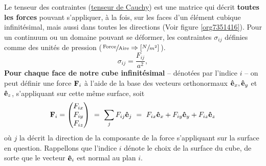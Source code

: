 \documentclass[10pt]{article}
\numberwithin{equation}{section}
\newcommand{\evf}{\vb{\hat{e}}}
\newcommand{\pt}{\hspace{1pt}} %
\begin{document}
Le tenseur des contraintes (\href{https://en.wikipedia.org/wiki/Cauchy\_stress\_tensor}{tenseur de Cauchy}) est une matrice qui décrit \textbf{toutes les forces} pouvant s'appliquer, à la fois, sur les faces d'un élément cubique infinitésimal, mais aussi dans toutes les directions (Voir figure \ref{org7351416}).
Pour un continuum ou un domaine pouvant se déformer, les contraintes \(\sigma_{ij}\) définies comme des unités de pression    (\(\pt\sfrac{\text{Force}}{\text{Aire}}\Rightarrow\qty[\sfrac{N}{m^2}]\pt\)).\bigskip
\begin{equation}
    \sigma_{ij} = \frac{F_{ij}}{a^2},
\end{equation}
\textbf{Pour chaque face de notre cube infinitésimal} -- dénotées par l'indice \(i\) -- on peut définir une force \(\vb{F}_i\) à l'aide de la base des vecteurs orthonormaux \(\evf_x,\evf_y\) et \(\evf_z\), s'appliquant sur cette même surface, soit
\begin{equation}
   \vb{F}_i =
   \begin{pmatrix}
     F_{ix} \\
     F_{iy} \\
     F_{iz} \\
   \end{pmatrix}\  = \ \sum_j F_{ij}\evf_j\ = \ F_{ix}\evf_x + F_{iy}\evf_y + F_{iz}\evf_z
\end{equation}
où \(j\) la décrit la direction de la composante de la force s'appliquant sur la surface en question.
Rappellons que l'indice \(i\) dénote le choix de la surface du cube, de sorte que le vecteur \(\evf_i\) est normal au plan \(i\).
\end{document}
